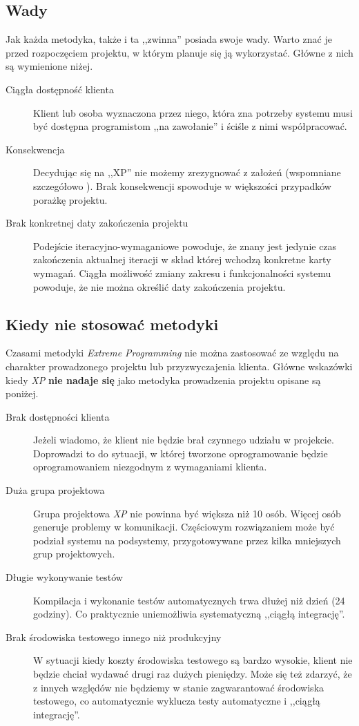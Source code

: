\subsection{Wady}
\label{sec:ZMTOwady}

Jak każda metodyka, także i ta ,,zwinna'' posiada swoje wady. Warto znać je przed rozpoczęciem projektu, w którym planuje się ją wykorzystać. Główne z nich są wymienione niżej.

\begin{description}
    \item[Ciągła dostępność klienta]{Klient lub osoba wyznaczona przez niego, która zna potrzeby systemu musi być dostępna programistom ,,na zawołanie'' i ściśle z nimi współpracować.}
    \item[Konsekwencja]{Decydując się na ,,XP'' nie możemy zrezygnować z założeń (wspomniane szczegółowo ). Brak konsekwencji spowoduje w większości przypadków porażkę projektu.}
    \item[Brak konkretnej daty zakończenia projektu]{Podejście iteracyjno-wymaganiowe powoduje, że znany jest jedynie czas zakończenia aktualnej iteracji w skład której wchodzą konkretne karty wymagań. Ciągła możliwość zmiany zakresu i funkcjonalności systemu powoduje, że nie można określić daty zakończenia projektu.}
\end{description}

\subsection{Kiedy nie stosować metodyki}
\label{sec:ZMTOknsm}

Czasami metodyki \textit{Extreme Programming} nie można zastosować ze względu na charakter prowadzonego projektu lub przyzwyczajenia klienta. Główne wskazówki kiedy \textit{XP} \textbf{nie nadaje się} jako metodyka prowadzenia projektu opisane są poniżej.

\begin{description}
    \item[Brak dostępności klienta]Jeżeli wiadomo, że klient nie będzie brał czynnego udziału w projekcie. Doprowadzi to do sytuacji, w której tworzone oprogramowanie będzie oprogramowaniem niezgodnym z wymaganiami klienta.
    \item[Duża grupa projektowa] Grupa projektowa \textit{XP} nie powinna być większa niż 10 osób. Więcej osób generuje problemy w komunikacji. Częściowym rozwiązaniem może być podział systemu na podsystemy, przygotowywane przez kilka mniejszych grup projektowych.
    \item[Długie wykonywanie testów] Kompilacja i wykonanie testów automatycznych trwa dłużej niż dzień (24 godziny). Co praktycznie uniemożliwia systematyczną ,,ciągłą integrację''.
    \item[Brak środowiska testowego innego niż produkcyjny] W sytuacji kiedy koszty środowiska testowego są bardzo wysokie, klient nie będzie chciał wydawać drugi raz dużych pieniędzy. Może się też zdarzyć, że z innych względów nie będziemy w stanie zagwarantować środowiska testowego, co automatycznie wyklucza testy automatyczne i ,,ciągłą integrację''.
\end{description}

